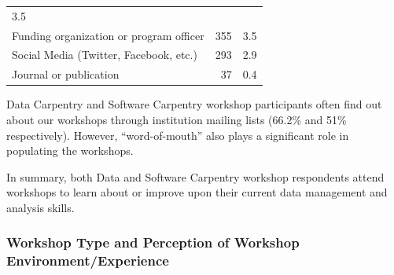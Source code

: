 \documentclass[]{article}
\begin{document}
\begin{longtable}[]{@{}lrr@{}}
\begin{minipage}[t]{0.06\columnwidth}
3.5\strut
\end{minipage}\tabularnewline
\begin{minipage}[t]{0.78\columnwidth}\raggedright\strut
Funding organization or program officer\strut
\end{minipage} & \begin{minipage}[t]{0.06\columnwidth}\raggedleft\strut
355\strut
\end{minipage} & \begin{minipage}[t]{0.06\columnwidth}\raggedleft\strut
3.5\strut
\end{minipage}\tabularnewline
\begin{minipage}[t]{0.78\columnwidth}\raggedright\strut
Social Media (Twitter, Facebook, etc.)\strut
\end{minipage} & \begin{minipage}[t]{0.06\columnwidth}\raggedleft\strut
293\strut
\end{minipage} & \begin{minipage}[t]{0.06\columnwidth}\raggedleft\strut
2.9\strut
\end{minipage}\tabularnewline
\begin{minipage}[t]{0.78\columnwidth}\raggedright\strut
Journal or publication\strut
\end{minipage} & \begin{minipage}[t]{0.06\columnwidth}\raggedleft\strut
37\strut
\end{minipage} & \begin{minipage}[t]{0.06\columnwidth}\raggedleft\strut
0.4\strut
\end{minipage}\tabularnewline
\bottomrule
\end{longtable}

Data Carpentry and Software Carpentry workshop participants often find
out about our workshops through institution mailing lists (66.2\% and
51\% respectively). However, ``word-of-mouth'' also plays a significant
role in populating the workshops.

In summary, both Data and Software Carpentry workshop respondents attend
workshops to learn about or improve upon their current data management
and analysis skills.

\subsubsection{Workshop Type and Perception of Workshop
Environment/Experience}\label{workshop-type-and-perception-of-workshop-environmentexperience}
\end{document}

